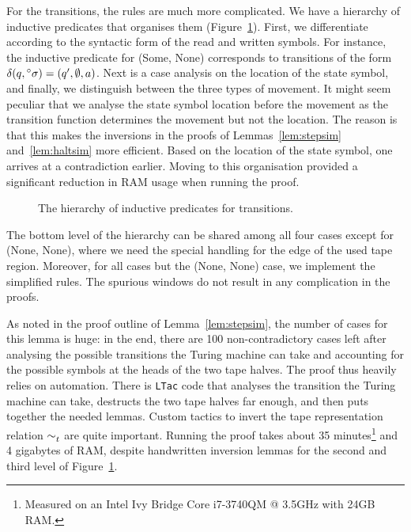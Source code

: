 For the transitions, the rules are much more complicated. We have a hierarchy of inductive predicates that organises them (Figure~\ref{fig:orga_rules}). First, we differentiate according to the syntactic form of the read and written symbols. For instance, the inductive predicate for (Some, None) corresponds to transitions of the form $\delta (q, \prescript{\circ}{}\sigma) = (q', \emptyset, a)$. 
Next is a case analysis on the location of the state symbol, and finally, we distinguish between the three types of movement.
It might seem peculiar that we analyse the state symbol location before the movement as the transition function determines the movement but not the location. The reason is that this makes the inversions in the proofs of Lemmas~\ref{lem:stepsim} and~\ref{lem:haltsim} more efficient. Based on the location of the state symbol, one arrives at a contradiction earlier. Moving to this organisation provided a significant reduction in RAM usage when running the proof. 
\begin{figure}
  \begin{center}
  \end{center}
  \caption{The hierarchy of inductive predicates for transitions.}\label{fig:orga_rules}
\end{figure}

The bottom level of the hierarchy can be shared among all four cases except for (None, None), where we need the special handling for the edge of the used tape region. Moreover, for all cases but the (None, None) case, we implement the simplified rules. The spurious windows do not result in any complication in the proofs.

As noted in the proof outline of Lemma~\ref{lem:stepsim}, the number of cases for this lemma is huge: in the end, there are 100 non-contradictory cases left after analysing the possible transitions the Turing machine can take and accounting for the possible symbols at the heads of the two tape halves. The proof thus heavily relies on automation. There is \texttt{LTac} code that analyses the transition the Turing machine can take, destructs the two tape halves far enough, and then puts together the needed lemmas. Custom tactics to invert the tape representation relation $\sim_t^{}$ are quite important.
Running the proof takes about 35 minutes\footnote{Measured on an Intel Ivy Bridge Core i7-3740QM @ 3.5GHz with 24GB RAM.} and 4 gigabytes of RAM, despite handwritten inversion lemmas for the second and third level of Figure~\ref{fig:orga_rules}. 

